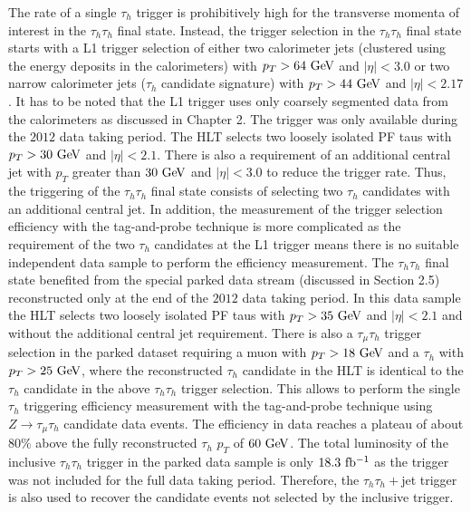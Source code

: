 The rate of a single $\tau_h$ trigger is prohibitively high for the transverse momenta of interest in the $\tau_h\tau_h$ final state. Instead, the trigger selection in the $\tau_h\tau_h$ final state starts with a L1 trigger selection of either two calorimeter jets (clustered using the energy deposits in the calorimeters) with $p_{T}>64~\mathrm{Ge\kern -0.1em V}$ and $|\eta|<3.0 $ or two narrow calorimeter jets ($\tau_h$ candidate signature) with $p_{T}>44~\mathrm{Ge\kern -0.1em V}$ and $|\eta|<2.17$. It has to be noted that the L1 trigger uses only coarsely segmented data from the calorimeters as discussed in Chapter 2. The trigger was only available during the $2012$ data taking period. The HLT selects two loosely isolated  PF taus with $p_{T}>30~\mathrm{Ge\kern -0.1em V}$ and $|\eta|<2.1$. There is also  a requirement of an additional central jet with $p_{T}$ greater than $30~\mathrm{Ge\kern -0.1em V}$ and $|\eta|<3.0$ to reduce the trigger rate. Thus, the triggering of the $\tau_h\tau_h$ final state consists of selecting two $\tau_h$ candidates with an additional central jet.  In addition, the measurement of the trigger selection efficiency with the tag-and-probe technique is more complicated as the requirement of the two $\tau_h$ candidates at the L1 trigger means there is no suitable independent data sample to perform the efficiency measurement. The $\tau_{h}\tau_{h}$ final state benefited from the special parked data stream (discussed in Section 2.5) reconstructed only at the end of the $2012$ data taking period. In this data sample the HLT selects two loosely isolated  PF taus with $p_{T}>35~\mathrm{Ge\kern -0.1em V}$ and $|\eta|<2.1$ and without the additional central jet requirement. There is also a $\tau_{\mu}\tau_{h}$ trigger selection in the parked dataset requiring a muon with $p_{T}>18~\mathrm{Ge\kern -0.1em V}$ and a $\tau_h$ with $p_T>25~\mathrm{Ge\kern -0.1em V}$, where the reconstructed $\tau_h$ candidate in the HLT is identical to the $\tau_h$ candidate in the above $\tau_h\tau_h$ trigger selection. This allows to perform the single $\tau_h$ triggering efficiency measurement with the tag-and-probe technique using $Z\rightarrow\tau_{\mu}\tau_{h}$ candidate data events. The efficiency in data reaches a plateau of about $80\%$ above the fully reconstructed $\tau_h$ $p_T$ of $60~\mathrm{Ge\kern -0.1em V}$. The total luminosity of the inclusive $\tau_h\tau_h$ trigger in the parked data sample is only $18.3~\mathrm{fb^{-1}}$ as the trigger was not included for the full data taking period. Therefore, the $\tau_h\tau_h+$jet trigger is also used to recover the candidate events not selected by the inclusive trigger.

